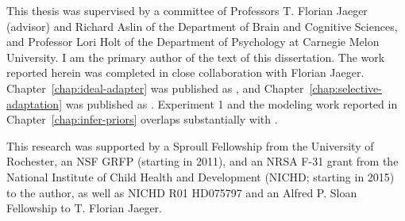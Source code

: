 \begin{contributorsandfunding}
  This thesis was supervised by a committee of Professors T. Florian Jaeger
  (advisor) and Richard Aslin of the Department of Brain and Cognitive Sciences,
  and Professor Lori Holt of the Department of Psychology at Carnegie Melon
  University. I am the primary author of the text of this dissertation. The work
  reported herein was completed in close collaboration with Florian
  Jaeger. Chapter~\ref{chap:ideal-adapter} was published as
  \textcite{Kleinschmidt2015}, and Chapter~\ref{chap:selective-adaptation} was
  published as \textcite{Kleinschmidt2015b}. Experiment 1 and the modeling work
  reported in Chapter~\ref{chap:infer-priors} overlaps substantially with
  \textcite{Kleinschmidt2016}.

  This research was supported by a Sproull Fellowship from the University of
  Rochester, an NSF GRFP (starting in 2011), and an NRSA F-31 grant from the
  National Institute of Child Health and Development (NICHD; starting in 2015)
  to the author, as well as NICHD R01 HD075797 and an Alfred P. Sloan Fellowship
  to T. Florian Jaeger.
\end{contributorsandfunding}